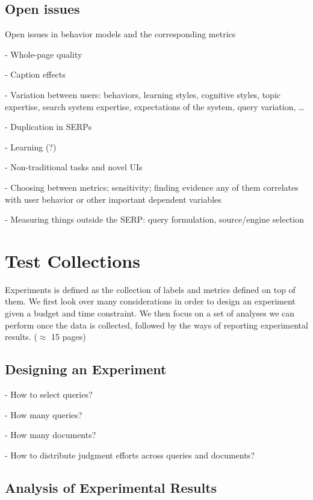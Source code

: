 \documentclass[openany]{now} %
\begin{document}
\section{Open issues}

Open issues in behavior models and the corresponding metrics

- Whole-page quality

- Caption effects

- Variation between users: behaviors, learning styles, cognitive styles, topic expertise, search system expertise, expectations of the system, query variation, \dots

- Duplication in SERPs

- Learning (?)

- Non-traditional tasks and novel UIs

- Choosing between metrics; sensitivity; finding evidence any of them correlates with user behavior or other important dependent variables

- Measuring things outside the SERP: query formulation, source/engine selection

\chapter{Test Collections}
\label{c-collection}

Experiments is defined as the collection of labels and metrics defined on top of them. We first look over many considerations in order to design an experiment given a budget and time constraint. We then focus on a set of analyses we can perform once the data is collected, followed by the ways of reporting experimental results. (\ensuremath{\approx} 15 pages)

\section{Designing an Experiment}

- How to select queries?

- How many queries? \cite{Sakai:2014}

- How many documents? \cite{CarterettePFK09}

- How to distribute judgment efforts across queries and documents? \cite{CarterettePKAA09, YilmazR09}


\section{Analysis of Experimental Results}
\end{document}
